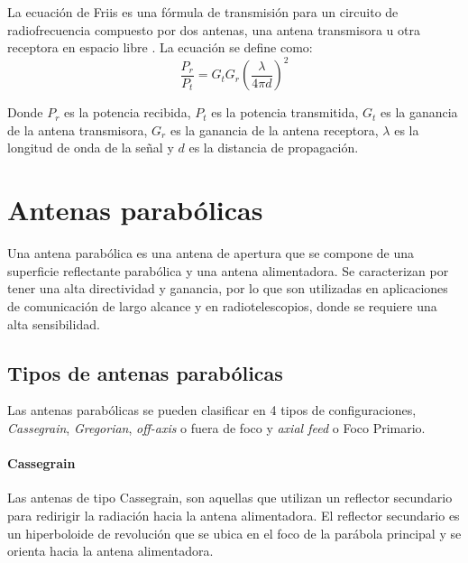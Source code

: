 La ecuación de Friis es una fórmula de transmisión para un circuito de radiofrecuencia compuesto por dos antenas, una antena transmisora u otra receptora en espacio libre \cite{Friis1946}. La ecuación se define como:\\

\begin{equation}
    \frac{P_{r}}{P_{t}} = G_{t}G_{r}\left(\frac{\lambda}{4\pi d}\right)^{2}
\end{equation}

Donde $P_{r}$ es la potencia recibida, $P_{t}$ es la potencia transmitida, $G_{t}$ es la ganancia de la antena transmisora, $G_{r}$ es la ganancia de la antena receptora, $\lambda$ es la longitud de onda de la señal y $d$ es la distancia de propagación.\\

\section{Antenas parabólicas}

Una antena parabólica es una antena de apertura que se compone de una superficie reflectante parabólica y una antena alimentadora. Se caracterizan por tener una alta directividad y ganancia, por lo que son utilizadas en aplicaciones de comunicación de largo alcance y en radiotelescopios, donde se requiere una alta sensibilidad.\\


\subsection{Tipos de antenas parabólicas}

Las antenas parabólicas se pueden clasificar en 4 tipos de configuraciones, \textit{Cassegrain}, \textit{Gregorian}, \textit{off-axis} o fuera de foco y \textit{axial feed} o Foco Primario.\\

\paragraph{Cassegrain}

Las antenas de tipo Cassegrain, son aquellas que utilizan un reflector secundario para redirigir la radiación hacia la antena alimentadora. El reflector secundario es un hiperboloide de revolución que se ubica en el foco de la parábola principal y se orienta hacia la antena alimentadora.

